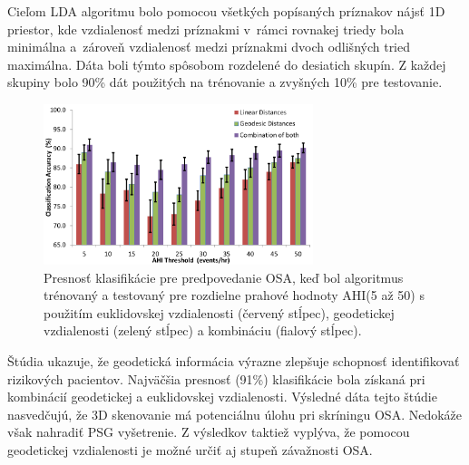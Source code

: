 Cieľom LDA algoritmu bolo pomocou všetkých popísaných príznakov nájsť 1D priestor, kde vzdialenosť medzi príznakmi v rámci rovnakej triedy bola minimálna a zároveň vzdialenosť medzi príznakmi dvoch odlišných tried maximálna. Dáta boli týmto spôsobom rozdelené do desiatich skupín. Z každej skupiny bolo 90\% dát použitých na trénovanie a zvyšných 10\% pre testovanie. 

\begin{figure}[h]
	\centering
	\includegraphics[width=0.7\textwidth]{figures/resers_l.png}
	\caption{Presnosť klasifikácie pre predpovedanie OSA, keď bol algoritmus trénovaný a testovaný pre rozdielne prahové hodnoty AHI(5 až 50) s použitím euklidovskej vzdialenosti (červený stĺpec), geodetickej vzdialenosti (zelený stĺpec) a kombináciu (fialový stĺpec). }
	\label{fig:resers:l}
\end{figure}

Štúdia ukazuje, že geodetická informácia výrazne zlepšuje schopnosť identifikovať rizikových pacientov. Najväčšia presnosť (91\%) klasifikácie bola získaná pri kombinácií geodetickej a euklidovskej vzdialenosti. Výsledné dáta tejto štúdie nasvedčujú, že 3D skenovanie má potenciálnu úlohu pri skríningu OSA. Nedokáže však nahradiť PSG vyšetrenie. Z výsledkov taktiež vyplýva, že pomocou geodetickej vzdialenosti je možné určiť aj stupeň závažnosti OSA.
